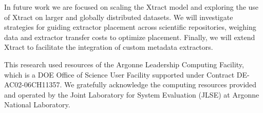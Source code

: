 \documentclass[sigconf]{acmart}
\newcommand{\tyler}[1]{}
\newcommand{\kyle}[1]{}
\newcommand{\tyler}[1]{{\textcolor{cyan}{ tyler: #1 }}}
\newcommand{\kyle}[1]{{\textcolor{purple}{ Kyle: #1 }}}
\newcommand{\name}{Xtract}
\begin{document}
In future work we are focused on scaling the \name{} model and exploring the use
of \name{} on larger and globally distributed datasets. We will investigate strategies
for guiding extractor placement across scientific repositories, weighing 
data and extractor transfer costs to optimize placement. Finally, we
will extend \name{} to facilitate the integration of custom metadata extractors.
\begin{acks}

This research used resources of the
Argonne Leadership Computing Facility, which is a DOE Office of Science User
Facility supported under Contract DE-AC02-06CH11357. 
We gratefully acknowledge the computing resources provided and 
operated by the Joint Laboratory for System Evaluation (JLSE) at Argonne National Laboratory. 


\end{acks}



\end{document}
